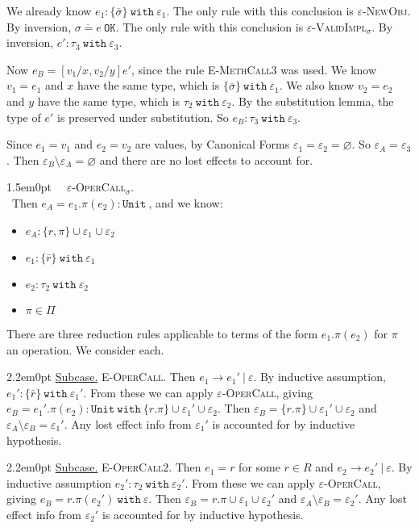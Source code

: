 \documentclass{llncs}
\newcommand{\keywadj}[1]{\mathtt{#1}}
\newcommand{\keyw}[1]{\keywadj{#1}~}
\newcommand{\proofcase}[2]{
	\begin{adjustwidth}{1.5em}{0pt}
		\fbox{Case.}~~#1. \\ ~#2
	\end{adjustwidth}
}
\newcommand{\subcase}[1] {
	\begin{adjustwidth}{2.2em}{0pt}
		\underline{Subcase.} #1
	\end{adjustwidth}
}
\begin{document}
{{{	\noindent	
We already know $e_1  : \{ \overline \sigma \}~ \keyw{with} \varepsilon_1$. The only rule with this conclusion is \textsc{$\varepsilon$-NewObj}. By inversion, $\overline{ \sigma = e }~\keywadj{OK}$. The only rule with this conclusion is \textsc{$\varepsilon$-ValidImpl$_{\sigma}$}. By inversion, $e' : \tau_3~\keyw{with} \varepsilon_3$.

		\noindent
Now $e_B = [v_1/x, v_2/y]e'$, since the rule \textsc{E-MethCall3} was used. We know $v_1 = e_1$ and $x$ have the same type, which is $\{ \overline \sigma \}~ \keyw{with} \varepsilon_1$. We also know $v_2 = e_2$ and $y$ have the same type, which is $\tau_2~\keyw{with} \varepsilon_2$. By the substitution lemma, the type of $e'$ is preserved under substitution. So $e_B : \tau_3~\keyw{with} \varepsilon_3$. 

		\noindent
Since $e_1 = v_1$ and $e_2 = v_2$ are values, by Canonical Forms $\varepsilon_1 = \varepsilon_2 = \varnothing$. So $\varepsilon_A = \varepsilon_3$. Then $\varepsilon_B \setminus \varepsilon_A = \varnothing$ and there are no lost effects to account for.
\\ }
}


	\proofcase{\textsc{$\varepsilon$-OperCall$_{\sigma}$}} {Then $e_A = e_1.\pi(e_2) : \keyw{Unit}$, and we know:
	\begin{itemize}
		\item $e_A :  \{ r, \pi \} \cup \varepsilon_1 \cup \varepsilon_2$
		\item $e_1 : \{ \bar r \}~\keyw{with} \varepsilon_1$
		\item $e_2 : \tau_2~\keyw{with} \varepsilon_2$
		\item $\pi \in \Pi$
	\end{itemize}
There are three reduction rules applicable to terms of the form $e_1.\pi(e_2)$ for $\pi$ an operation. We consider each.

	\subcase { \textsc{E-OperCall}. Then $e_1 \longrightarrow e_1'~|~\varepsilon$. By inductive assumption, $e_1' : \{ \bar r \} ~ \keyw{with} \varepsilon_1'$. From these we can apply \textsc{$\varepsilon$-OperCall}, giving $e_B = e_1'.\pi(e_2) : \keyw{Unit~with} \{ r.\pi \} \cup \varepsilon_1' \cup \varepsilon_2$. Then $\varepsilon_B = \{ r.\pi \} \cup \varepsilon_1' \cup \varepsilon_2$ and $\varepsilon_A \setminus \varepsilon_B = \varepsilon_1'$. Any lost effect info from $\varepsilon_1'$ is accounted for by inductive hypothesis.
	}
	
	\subcase{ \textsc{E-OperCall2}. Then $e_1 = r$ for some $r \in R$ and $e_2 \longrightarrow e_2'~|~\varepsilon$. By inductive assumption $e_2' : \tau_2~\keyw{with} \varepsilon_2'$. From these we can apply \textsc{$\varepsilon$-OperCall}, giving $e_B = r.\pi(e_2')~\keyw{with} \varepsilon$. Then $\varepsilon_B = r.\pi \cup \varepsilon_1 \cup \varepsilon_2'$ and $\varepsilon_A \setminus \varepsilon_B = \varepsilon_2'$. Any lost effect info from $\varepsilon_2'$ is accounted for by inductive hypothesis.
		}
	
}}
\end{document}
